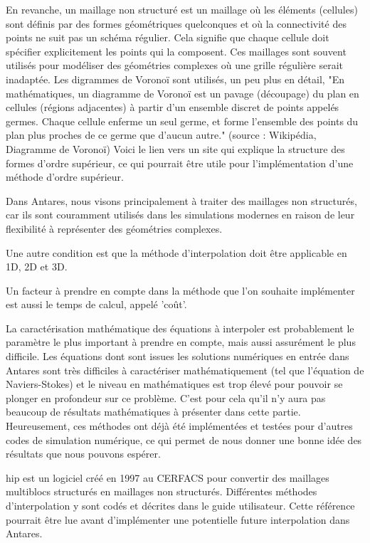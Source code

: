 En revanche, un maillage non structuré est un maillage où les éléments (cellules) sont définis par des formes géométriques quelconques et où la connectivité des points ne suit pas un schéma régulier. Cela signifie que chaque cellule doit spécifier explicitement les points qui la composent. Ces maillages sont souvent utilisés pour modéliser des géométries complexes où une grille régulière serait inadaptée. Les digrammes de Voronoï sont utilisés, un peu plus en détail, "En mathématiques, un diagramme de Voronoï est un pavage (découpage) du plan en cellules (régions adjacentes) à partir d'un ensemble discret de points appelés germes. Chaque cellule enferme un seul germe, et forme l'ensemble des points du plan plus proches de ce germe que d'aucun autre." (source : Wikipédia, Diagramme de Voronoï)
Voici le lien vers un site\cite{structure} qui explique la structure des formes d'ordre supérieur, ce qui pourrait être utile pour l'implémentation d'une méthode d'ordre supérieur.

Dans Antares, nous visons principalement à traiter des maillages non structurés, car ils sont couramment utilisés dans les simulations modernes en raison de leur flexibilité à représenter des géométries complexes.

Une autre condition est que la méthode d'interpolation doit être applicable en 1D, 2D et 3D.

Un facteur à prendre en compte dans la méthode que l'on souhaite implémenter est aussi le temps de calcul, appelé 'coût'.

La caractérisation mathématique des équations à interpoler est probablement le paramètre le plus important à prendre en compte, mais aussi assurément le plus difficile. Les équations dont sont issues les solutions numériques en entrée dans Antares sont très difficiles à caractériser mathématiquement (tel que l'équation de Naviers-Stokes) et le niveau en mathématiques est trop élevé pour pouvoir se plonger en profondeur sur ce problème\cite{gordont1971_2}. C'est pour cela qu'il n'y aura pas beaucoup de résultats mathématiques à présenter dans cette partie.
Heureusement, ces méthodes ont déjà été implémentées et testées pour d'autres codes de simulation numérique, ce qui permet de nous donner une bonne idée des résultats que nous pouvons espérer.


hip est un logiciel créé en 1997 au CERFACS pour convertir des maillages multiblocs structurés en maillages non structurés.
Différentes méthodes d'interpolation y sont codés et décrites dans le guide utilisateur\cite{muller2020}. Cette référence pourrait être lue avant d'implémenter une potentielle future interpolation dans Antares.


